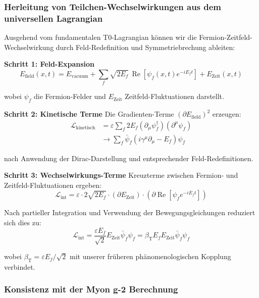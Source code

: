 \documentclass[12pt,a4paper]{article}
\newcommand{\betaT}{\beta_{\text{T}}}
\begin{document}
	\subsubsection{Herleitung von Teilchen-Wechselwirkungen aus dem universellen Lagrangian}
	
	Ausgehend vom fundamentalen T0-Lagrangian können wir die Fermion-Zeitfeld-Wechselwirkung durch Feld-Redefinition und Symmetriebrechung ableiten:
	
	\textbf{Schritt 1: Feld-Expansion}
	\begin{equation}
		E_{\text{field}}(x,t) = E_{\text{vacuum}} + \sum_f \sqrt{2E_f} \, \operatorname{Re}[\psi_f(x,t) e^{-iE_f t}] + E_{\text{Zeit}}(x,t)
	\end{equation}
	
	wobei $\psi_f$ die Fermion-Felder und $E_{\text{Zeit}}$ Zeitfeld-Fluktuationen darstellt.
	
	\textbf{Schritt 2: Kinetische Terme}
	Die Gradienten-Terme $(\partial E_{\text{field}})^2$ erzeugen:
	\begin{align}
		\mathcal{L}_{\text{kinetisch}} &= \varepsilon \sum_f 2E_f (\partial_{\mu} \psi_f^{\dagger})(\partial^{\mu} \psi_f) \\
		&\rightarrow \sum_f \bar{\psi}_f (i\gamma^{\mu} \partial_{\mu} - E_f) \psi_f
	\end{align}
	
	nach Anwendung der Dirac-Darstellung und entsprechender Feld-Redefinitionen.
	
	\textbf{Schritt 3: Wechselwirkungs-Terme}
	Kreuzterme zwischen Fermion- und Zeitfeld-Fluktuationen ergeben:
	\begin{equation}
		\mathcal{L}_{\text{int}} = \varepsilon \cdot 2\sqrt{2E_f} \cdot (\partial E_{\text{Zeit}}) \cdot (\partial \operatorname{Re}[\psi_f e^{-iE_f t}])
	\end{equation}
	
	Nach partieller Integration und Verwendung der Bewegungsgleichungen reduziert sich dies zu:
	\begin{equation}
		\mathcal{L}_{\text{int}} = \frac{\varepsilon E_f}{\sqrt{2}} E_{\text{Zeit}} \bar{\psi}_f \psi_f = \betaT E_f E_{\text{Zeit}} \bar{\psi}_f \psi_f
	\end{equation}
	
	wobei $\betaT = \varepsilon E_f/\sqrt{2}$ mit unserer früheren phänomenologischen Kopplung verbindet.
	
	\subsubsection{Konsistenz mit der Myon g-2 Berechnung}
	
\end{document}

